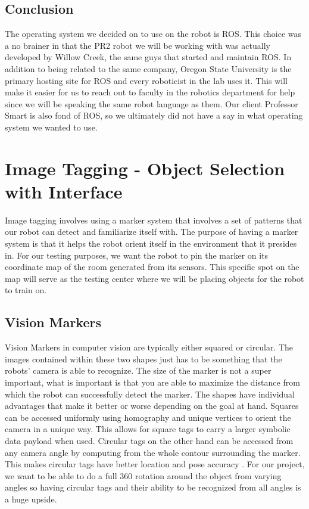 \documentclass[draftclsnofoot, onecolumn, 10pt, compsoc]{IEEEtran}
\begin{document}
\subsection{Conclusion}
The operating system we decided on to use on the robot is ROS. This choice was a no brainer in that the PR2 robot we will be working with was actually developed by Willow Creek, the same guys that started and maintain ROS. In addition to being related to the same company, Oregon State University is the primary hosting site for ROS and every roboticist in the lab uses it. This will make it easier for us to reach out to faculty in the robotics department for help since we will be speaking the same robot language as them. Our client Professor Smart is also fond of ROS, so we ultimately did not have a say in what operating system we wanted to use.
\section{Image Tagging - Object Selection with Interface}
Image tagging involves using a marker system that involves a set of patterns that our robot can detect and familiarize itself with. The purpose of having a marker system is that it helps the robot orient itself in the environment that it presides in. For our testing purposes, we want the robot to pin the marker on its coordinate map of the room generated from its sensors. This specific spot on the map will serve as the testing center where we will be placing objects for the robot to train on.
\subsection{Vision Markers}
Vision Markers in computer vision are typically either squared or circular. The images contained within these two shapes just has to be something that the robots’ camera is able to recognize. The size of the marker is not a super important, what is important is that you are able to maximize the distance from which the robot can successfully detect the marker. The shapes have individual advantages that make it better or worse depending on the goal at hand. Squares can be accessed uniformly using homography and unique vertices to orient the camera in a unique way. This allows for square tags to carry a larger symbolic data payload when used. Circular tags on the other hand can be accessed from any camera angle by computing from the whole contour surrounding the marker. This makes circular tags have better location and pose accuracy \cite{markerstech}. For our project, we want to be able to do a full 360 rotation around the object from varying angles so having circular tags and their ability to be recognized from all angles is a huge upside.
\end{document}
